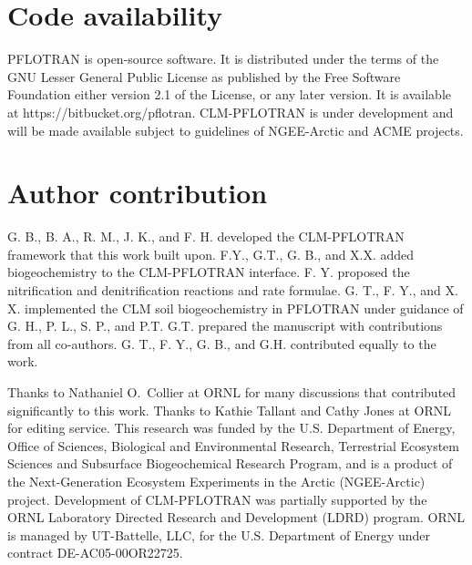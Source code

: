 \documentclass[gmd, manuscript]{copernicus}
\begin{document}
%
\section{Code availability}
PFLOTRAN is open-source software. It is distributed under the terms of the
GNU Lesser General Public License as published by the Free Software Foundation
either version 2.1 of the License, or any later version. It is available at
https://bitbucket.org/pflotran. 
CLM-PFLOTRAN is under development and will be made available subject to guidelines of NGEE-Arctic and ACME projects.

\section{Author contribution}
G. B., B. A., R. M., J. K., and F. H. developed the CLM-PFLOTRAN framework that this
work built upon. F.Y., G.T., G. B., and X.X. added biogeochemistry to the CLM-PFLOTRAN
interface. F. Y. proposed the nitrification and denitrification reactions and
rate formulae. G. T., F. Y., and X. X. implemented the CLM
soil biogeochemistry in PFLOTRAN under guidance of G. H., P. L., S. P., and P.T.
G.T. prepared the manuscript with contributions from all co-authors. 
G. T., F. Y., G. B., and G.H. contributed equally to the work.  

\begin{acknowledgements}
Thanks to Nathaniel O.\ Collier at ORNL for many discussions that contributed
significantly to this work.
Thanks to Kathie Tallant and Cathy Jones at ORNL for editing service. This
research was funded by the U.S. Department of Energy, Office of Sciences,
Biological and Environmental Research, Terrestrial Ecosystem Sciences and
Subsurface Biogeochemical Research Program, and is a product of the
Next-Generation Ecosystem Experiments in the Arctic (NGEE-Arctic) project. 
Development of CLM-PFLOTRAN was partially supported by the ORNL 
Laboratory Directed Research and Development (LDRD) program.
ORNL is managed by UT-Battelle, LLC, for the U.S. Department of Energy under
contract DE-AC05-00OR22725.
\end{acknowledgements}




\end{document}
